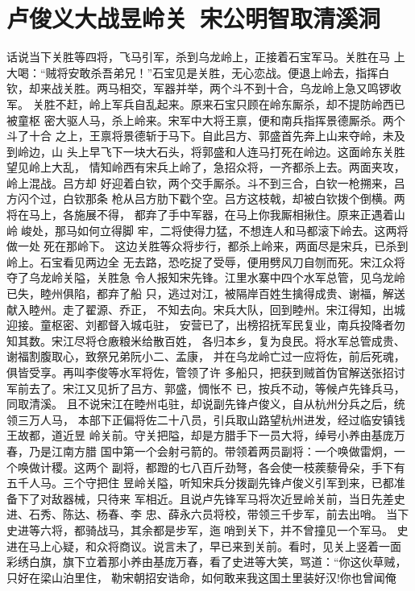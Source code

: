 \chapter{卢俊义大战昱岭关~宋公明智取清溪洞}

话说当下关胜等四将，飞马引军，杀到乌龙岭上，正接着石宝军马。关胜在马
上大喝：“贼将安敢杀吾弟兄！”石宝见是关胜，无心恋战。便退上岭去，指挥白
钦，却来战关胜。两马相交，军器并举，两个斗不到十合，乌龙岭上急又鸣锣收军。
关胜不赶，岭上军兵自乱起来。原来石宝只顾在岭东厮杀，却不提防岭西已被童枢
密大驱人马，杀上岭来。宋军中大将王禀，便和南兵指挥景德厮杀。两个斗了十合
之上，王禀将景德斩于马下。自此吕方、郭盛首先奔上山来夺岭，未及到岭边，山
头上早飞下一块大石头，将郭盛和人连马打死在岭边。这面岭东关胜望见岭上大乱，
情知岭西有宋兵上岭了，急招众将，一齐都杀上去。两面夹攻，岭上混战。吕方却
好迎着白钦，两个交手厮杀。斗不到三合，白钦一枪搠来，吕方闪个过，白钦那条
枪从吕方肋下戳个空。吕方这枝戟，却被白钦拨个倒横。两将在马上，各施展不得，
都弃了手中军器，在马上你我厮相揪住。原来正遇着山岭峻处，那马如何立得脚
牢，二将使得力猛，不想连人和马都滚下岭去。这两将做一处死在那岭下。
这边关胜等众将步行，都杀上岭来，两面尽是宋兵，已杀到岭上。石宝看见两边全
无去路，恐吃捉了受辱，便用劈风刀自刎而死。宋江众将夺了乌龙岭关隘，关胜急
令人报知宋先锋。江里水寨中四个水军总管，见乌龙岭已失，睦州俱陷，都弃了船
只，逃过对江，被隔岸百姓生擒得成贵、谢福，解送献入睦州。走了翟源、乔正，
不知去向。宋兵大队，回到睦州。宋江得知，出城迎接。童枢密、刘都督入城屯驻，
安营已了，出榜招抚军民复业，南兵投降者勿知其数。宋江尽将仓廒粮米给散百姓，
各归本乡，复为良民。将水军总管成贵、谢福割腹取心，致祭兄弟阮小二、孟康，
并在乌龙岭亡过一应将佐，前后死魂，俱皆受享。再叫李俊等水军将佐，管领了许
多船只，把获到贼首伪官解送张招讨军前去了。宋江又见折了吕方、郭盛，惆怅不
已，按兵不动，等候卢先锋兵马，同取清溪。
且不说宋江在睦州屯驻，却说副先锋卢俊义，自从杭州分兵之后，统领三万人马，
本部下正偏将佐二十八员，引兵取山路望杭州进发，经过临安镇钱王故都，道近昱
岭关前。守关把隘，却是方腊手下一员大将，绰号小养由基庞万春，乃是江南方腊
国中第一个会射弓箭的。带领着两员副将：一个唤做雷炯，一个唤做计稷。这两个
副将，都蹬的七八百斤劲弩，各会使一枝蒺藜骨朵，手下有五千人马。三个守把住
昱岭关隘，听知宋兵分拨副先锋卢俊义引军到来，已都准备下了对敌器械，只待来
军相近。且说卢先锋军马将次近昱岭关前，当日先差史进、石秀、陈达、杨春、李
忠、薛永六员将校，带领三千步军，前去出哨。
当下史进等六将，都骑战马，其余都是步军，迤哨到关下，并不曾撞见一个军马。
史进在马上心疑，和众将商议。说言未了，早已来到关前。看时，见关上竖着一面
彩绣白旗，旗下立着那小养由基庞万春，看了史进等大笑，骂道：“你这伙草贼，
只好在梁山泊里住，勒宋朝招安诰命，如何敢来我这国土里装好汉!你也曾闻俺
